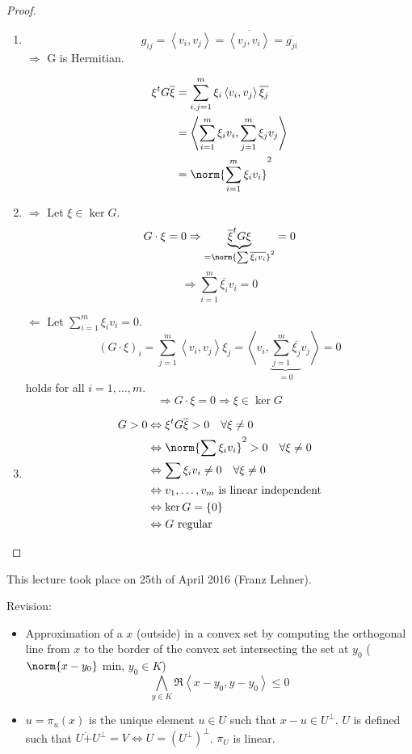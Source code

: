 \documentclass[a4paper,landscape,twocolumn]{article}
\newcommand\meta[3]{This #1 took place on #2 (#3).\par}
\newcommand\set[1]{\left\{#1\right\}}
\newcommand\functional[1]{\left\langle{#1}\right\rangle}
\theoremstyle{definition}
\DeclareMathOperator\kernel{ker} %
\DeclarePairedDelimiter\norm\lVert\rVert
\begin{document}
\begin{proof}
  \begin{enumerate}
    \item
      \[ g_{ij} = \functional{v_i, v_j} = \overline{\functional{v_j, v_i}} = \overline{g_{ji}} \]
      $\Rightarrow$ G is Hermitian.

      \begin{align*}
        \xi^t G \overline{\xi} &= \sum_{i,j=1}^m \xi_i \functional{v_i, v_j} \overline{\xi_j} \\
          &= \functional{\sum_{i=1}^m \xi_i v_i, \sum_{j=1}^m \xi_j v_j} \\
          &= \norm{\sum_{i=1}^m \xi_i v_i}^2
      \end{align*}
    \item $\Rightarrow$
      Let $\xi \in \kernel{G}$.
      \[ G \cdot \xi = 0 \Rightarrow \underbrace{\overline{\xi}^t G \xi}_{= \norm{\sum \overline{\xi_i v_i}}^2} = 0 \]
      \[ \Rightarrow \sum_{i=1}^m \overline{\xi_i} v_i = 0 \]

      $\Leftarrow$
      Let $\sum_{i=1}^m \xi_i v_i = 0$.
      \[
        (G \cdot \xi)_i = \sum_{j=1}^m \functional{v_i, v_j} \xi_j
        = \functional{v_i, \underbrace{\sum_{j=1}^m \overline{\xi_j}}_{=0} v_j} = 0
      \]
      holds for all $i = 1,\ldots,m$.
      \[ \Rightarrow G \cdot \xi = 0 \Rightarrow \xi \in \kernel{G} \]
    \item
      \begin{align*}
        G > 0 &\Leftrightarrow \xi^t G \overline{\xi} > 0 \quad \forall \xi \neq 0 \\
          &\Leftrightarrow \norm{\sum \xi_i v_i}^2 > 0 \quad \forall \xi \neq 0 \\
          &\Leftrightarrow \sum \xi_i v_i \neq 0 \quad \forall \xi \neq 0 \\
          &\Leftrightarrow v_1,\ldots,v_m \text{ is linear independent} \\
          &\Leftrightarrow \kernel{G} = \set{0} \\
          &\Leftrightarrow G \text{ regular}
      \end{align*}
  \end{enumerate}
\end{proof}

\meta{lecture}{25th of April 2016}{Franz Lehner}

Revision:
\begin{itemize}
  \item Approximation of a $x$ (outside) in a convex set by computing the orthogonal line from $x$ to the border of the convex set intersecting the set at $y_0$ ($\norm{x - y_0}$ min, $y_0 \in K$)
  \[ \bigwedge_{y \in K} \Re{\functional{x - y_0, y - y_0}} \leq 0 \]
  \item $u = \pi_u(x)$ is the unique element $u \in U$ such that $x-u \in U^\bot$. $U$ is defined such that $U \dot{+} U^\bot = V \Leftrightarrow U = (U^\bot)^\bot$. $\pi_U$ is linear.
\end{itemize}
\end{document}
